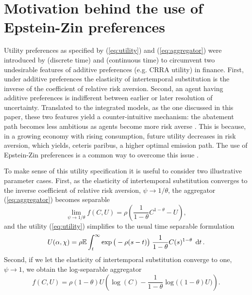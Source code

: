 \documentclass[../../main.tex]{subfiles}
\begin{document}
\section{Motivation behind the use of Epstein-Zin preferences} \label{appendix:epstein-zin}

Utility preferences as specified by (\ref{eq:utility}) and (\ref{eq:aggregator}) were introduced by \citep{epstein_substitution_1989} (discrete time) and \citep{duffie_asset_1992} (continuous time) to circumvent two undesirable features of additive preferences (e.g. CRRA utility) in finance. First, under additive preferences the elasticity of intertemporal substitution is the inverse of the coefficient of relative risk aversion. Second, an agent having additive preferences is indifferent between earlier or later resolution of uncertainty. Translated to the integrated models, as the one discussed in this paper, these two features yield a counter-intuitive mechanism: the abatement path becomes less ambitious as agents become more risk averse \citep{pindyck_economic_2013}. This is because, in a growing economy with rising consumption, future utility decreases in risk aversion, which yields, ceteris paribus, a higher optimal emission path. The use of Epstein-Zin preferences is a common way to overcome this issue \citep{pindyck_economic_2013, crost_optimal_2013, ackerman_epsteinzin_2013, hambel_optimal_2021,  olijslagers_discounting_2019}.

To make sense of this utility specification it is useful to consider two illustrative parameter cases. First, as the elasticity of intertemporal substitution converges to the inverse  coefficient of relative risk aversion, $\psi \to 1 / \theta$, the aggregator (\ref{eq:aggregator}) becomes separable \begin{equation}
    \lim_{\psi \to 1 / \theta} f(C, U) = \rho \left(\frac{1}{1 - \theta} C^{1 - \theta} - U\right),
\end{equation} and the utility (\ref{eq:utility}) simplifies to the usual time separable formulation \begin{equation}
    U(\alpha, \chi) = \rho\mathbb{E} \int^{\infty}_t \exp\big(-\rho (s - t) \big) \; \frac{1}{1 - \theta} C(s)^{1 - \theta} \; \dd{t}.
\end{equation} Second, if we let the elasticity of intertemporal substitution converge to one, $\psi \to 1$, we obtain the log-separable aggregator \begin{equation} \label{eq:epstein-zin:log-separable}
    f(C, U) = \rho (1 - \theta)U \left(\log(C) - \frac{1}{1 - \theta} \log\big( (1 - \theta) U \big) \right).
\end{equation}
\end{document}
